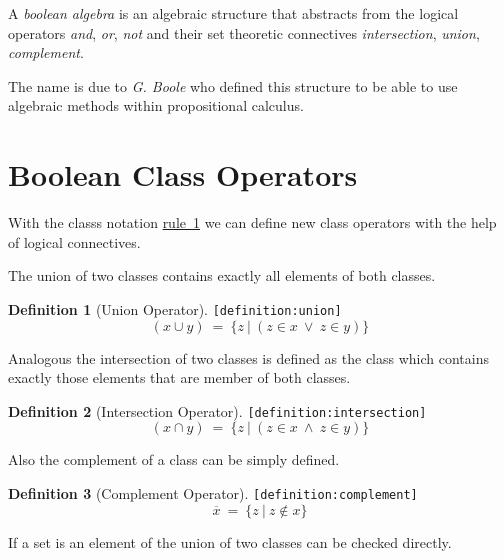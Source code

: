 \documentclass[a4paper,german,10pt,twoside]{book}
\theoremstyle{definition}
\newtheorem{defn}{Definition}
\theoremstyle{remark}
\begin{document}
A \emph{boolean algebra} is an algebraic structure that abstracts from the
logical operators \emph{and}, \emph{or}, \emph{not} and their set theoretic
connectives \emph{intersection}, \emph{union}, \emph{complement}.

\par
The name is due to \emph{G. Boole} who defined this structure to be able to
use algebraic methods within propositional calculus.

\section{Boolean Class Operators} \label{chapter4_section1} \hypertarget{chapter4_section1}{}
With the classs notation \hyperlink{rule:classDefinition}{rule~1} we can define new class operators with the
help of logical connectives.

\par
The union of two classes contains exactly all elements of both classes.

\begin{defn}[Union Operator]
\label{definition:union} \hypertarget{definition:union}{}
{\tt \tiny [\verb]definition:union]]}
$$(x \cup y) \ = \ \{ z \ | \ (z \in x\ \lor\ z \in y) \} $$
\end{defn}


\par
Analogous the intersection of two classes is defined as the class which 
contains exactly those elements that are member of both classes.

\begin{defn}[Intersection Operator]
\label{definition:intersection} \hypertarget{definition:intersection}{}
{\tt \tiny [\verb]definition:intersection]]}
$$(x \cap y) \ = \ \{ z \ | \ (z \in x\ \land\ z \in y) \} $$
\end{defn}


\par
Also the complement of a class can be simply defined.

\begin{defn}[Complement Operator]
\label{definition:complement} \hypertarget{definition:complement}{}
{\tt \tiny [\verb]definition:complement]]}
$$\overline{x} \ = \ \{ z \ | \ z \notin x \} $$
\end{defn}


\par
If a set is an element of the union of two classes can be checked directly.
\end{document}
